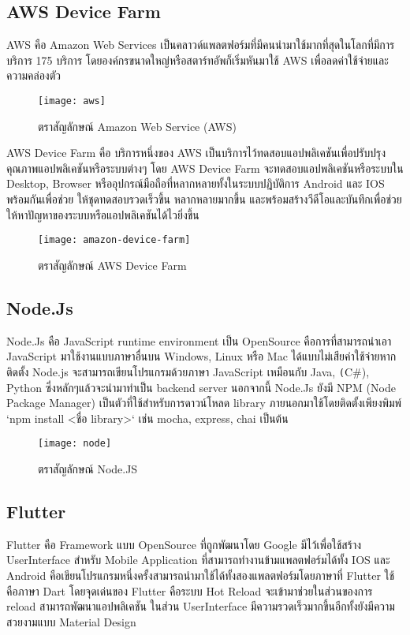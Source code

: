     \subsection{AWS Device Farm}
         AWS คือ Amazon Web Services เป็นคลาวด์แพลตฟอร์มที่มีคนนำมาใช้มากที่สุดในโลกที่มีการบริการ 175 บริการ
         โดยองค์กรขนาดใหญ่หรือสตาร์ทอัพก็เริ่มหันมาใช้ AWS เพื่อลดค่าใช้จ่ายและความคล่องตัว

        \begin{figure}[H]
            \centering
            \texttt{[image: aws]}
            \caption{ตราสัญลักษณ์ Amazon Web Service (AWS)}\label{aws}
        \end{figure}

        AWS Device Farm คือ บริการหนึ่งของ AWS เป็นบริการไว้ทดสอบแอปพลิเคชันเพื่อปรับปรุงคุณภาพแอปพลิเคชันหรือระบบต่างๆ
        โดย AWS Device Farm จะทดสอบแอปพลิเคชันหรือระบบใน Desktop, Browser หรืออุปกรณ์มือถือที่หลากหลายทั้งในระบบปฎิบัติการ Android และ IOS พร้อมกันเพื่อช่วย
        ให้ชุดทดสอบรวดเร็วขึ้น หลากหลายมากขึ้น และพร้อมสร้างวีดีโอและบันทึกเพื่อช่วยให้หาปัญหาของระบบหรือแอปพลิเคชันได้ไวยิ่งขึ้น

        \begin{figure}[H]
            \centering
            \texttt{[image: amazon-device-farm]}
            \caption{ตราสัญลักษณ์ AWS Device Farm}\label{amazon-device-farm}
        \end{figure}

    \subsection{Node.Js}
        Node.Js คือ JavaScript runtime environment เป็น OpenSource คือการที่สามารถนำเอา JavaScript มาใช้งานแบบภาษาอื่นบน
        Windows, Linux หรือ Mac ได้แบบไม่เสียค่าใช้จ่ายหากติดตั้ง Node.js จะสามารถเขียนโปรแกรมด้วยภาษา JavaScript เหมือนกับ Java, \texttt(C\#), Python
        ซึ่งหลักๆแล้วจะนำมาทำเป็น backend server นอกจากนี้ Node.Js ยังมี NPM (Node Package Manager) เป็นตัวที่ใช้สำหรับการดาวน์โหลด
        library ภายนอกมาใช้โดยติดตั้งเพียงพิมพ์ `npm install <ชื่อ library>` เช่น mocha, express, chai เป็นต้น

        \begin{figure}[H]
            \centering
            \texttt{[image: node]}
            \caption{ตราสัญลักษณ์ Node.JS}\label{node}
        \end{figure}
        

    \subsection{Flutter}
        Flutter คือ Framework แบบ OpenSource ที่ถูกพัฒนาโดย Google มีไว้เพื่อใช้สร้าง UserInterface สำหรับ Mobile Application ที่สามารถทำงานข้ามแพลตฟอร์มได้ทั้ง IOS และ Android คือเขียนโปรแกรมหนึ่งครั้งสามารถนำมาใช้ได้ทั้งสองแพลตฟอร์มโดยภาษาที่ Flutter ใช้คือภาษา Dart
        โดยจุดเด่นของ Flutter คือระบบ Hot Reload จะเข้ามาช่วยในส่วนของการ reload สามารถพัฒนาแอปพลิเคชัน ในส่วน UserInterface มีความรวดเร็วมากขึ้นอีกทั้งยังมีความสวยงามแบบ
        Material Design

